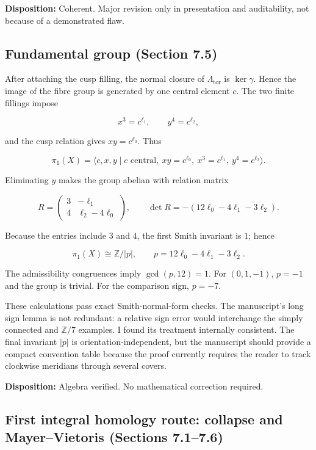 \documentclass[
  10pt,
  letterpaper,
]{article}
\newcommand{\Z}{\mathbb Z}
\begin{document}
\textbf{Disposition:} Coherent. Major revision only in presentation and
auditability, not because of a demonstrated flaw.

\subsection{Fundamental group (Section
7.5)}\label{fundamental-group-section-7.5}

After attaching the cusp filling, the normal closure of
\(\Lambda_{\mathrm{tor}}\) is \(\ker\gamma\). Hence the image of the
fibre group is generated by one central element \(c\). The two finite
fillings impose

\[
x^3=c^{\ell_1},\qquad y^4=c^{\ell_2},
\]

and the cusp relation gives \(xy=c^{\ell_0}\). Thus

\[
\pi_1(X)=\langle c,x,y\mid c\text{ central},\ xy=c^{\ell_0},\ x^3=c^{\ell_1},\ y^4=c^{\ell_2}\rangle.
\]

Eliminating \(y\) makes the group abelian with relation matrix

\[
R=\begin{pmatrix}
3&-\ell_1\\
4&\ell_2-4\ell_0
\end{pmatrix},
\qquad
\det R=-(12\ell_0-4\ell_1-3\ell_2).
\]

Because the entries include \(3\) and \(4\), the first Smith invariant
is \(1\); hence

\[
\pi_1(X)\cong\Z/|p|,
\qquad
p=12\ell_0-4\ell_1-3\ell_2.
\]

The admissibility congruences imply \(\gcd(p,12)=1\). For \((0,1,-1)\),
\(p=-1\) and the group is trivial. For the comparison sign, \(p=-7\).

These calculations pass exact Smith-normal-form checks. The manuscript's
long sign lemma is not redundant: a relative sign error would
interchange the simply connected and \(\Z/7\) examples. I found its
treatment internally consistent. The final invariant \(|p|\) is
orientation-independent, but the manuscript should provide a compact
convention table because the proof currently requires the reader to
track clockwise meridians through several covers.

\textbf{Disposition:} Algebra verified. No mathematical correction
required.

\subsection{First integral homology route: collapse and Mayer--Vietoris
(Sections
7.1--7.6)}\label{first-integral-homology-route-collapse-and-mayervietoris-sections-7.17.6}
\end{document}

